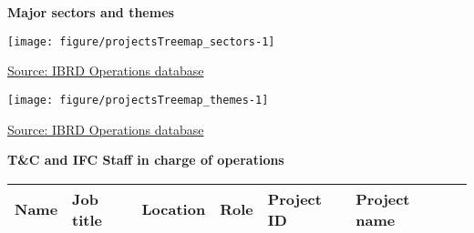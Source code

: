 \documentclass{article}\usepackage[]{graphicx}\usepackage[]{color}
\makeatletter
\def\maxwidth{ %
  \ifdim\Gin@nat@width>\linewidth
    \linewidth
  \else
    \Gin@nat@width
  \fi
}
\makeatother
\begin{document}
 \newpage
\begin{minipage}[t]{0.99\textwidth}
\raggedright{\color{white!30!blue} \textbf{\large Major sectors and themes}}
     \vspace*{0.5cm}
     
  \begin{minipage}[c]{0.49\textwidth} %
    \vspace*{0.4cm}


{\centering \texttt{[image: figure/projectsTreemap\_sectors-1]} 

}



    \hspace*{0.3cm} \raggedright\footnotesize{\href{http://www.weforum.org/reports/global-competitiveness-report-2015-2016}{Source: IBRD Operations database}}
  \end{minipage}
  \begin{minipage}[c]{0.49\textwidth} %
    \vspace*{0.4cm}


{\centering \texttt{[image: figure/projectsTreemap\_themes-1]} 

}



  \raggedright{\footnotesize{\href{http://lpi.worldbank.org}{Source: IBRD Operations database}}}
  \end{minipage}
\end{minipage}  
 
\begin{minipage}[b]{0.99\textwidth}
  \vspace*{1cm}
  \raggedright{\color{white!30!blue} \textbf{\large T\&C and IFC Staff in charge of operations}}
  \vspace*{0.5cm}
     
\begin{tabular}{>{\raggedright}p{1.4in}>{\raggedright}p{1in}>{\raggedright}p{1in}>{\raggedright}p{1in}l>{\raggedright}p{1.5in}l}
 Name & Job title & Location & Role & Project ID & Project name &  \\ 
  \hline
\end{tabular}

     \vspace*{0.5cm}
\end{minipage}

\end{document}
